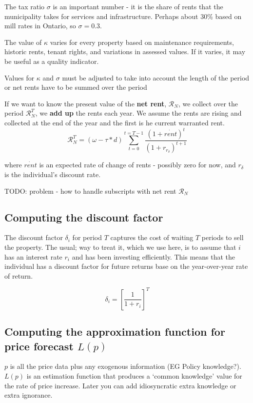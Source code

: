 The tax ratio $\sigma$ is an important number - it is the share of rents that the municipality takes for services and infrastructure. Perhaps about 30\% based on mill rates in Ontario,  so $\sigma = 0.3$. %

The value of $\kappa$  varies for every property based on maintenance requirements, historic rents, tenant rights, and variations in assessed values. If it varies, it may be useful as a quality indicator.

Values for $\kappa$ and $\sigma$ must be adjusted to take into account the length of the period or net rents have to be summed over the period

If we want to know the  present value  of the \textbf{net rent}, $\mathcal{R}_N$, we collect over the period  $\mathcal{R}_N^T$, we \textbf{add up} the rents each year. We assume the rents are rising and collected at the end of the year and the first is he current warranted rent.
\[\mathcal{R}_N^T= (\omega-\tau*d)\sum_{t=0}^{t=T-1} \frac{(1+\dot{rent})^{t}} {(1+r_{r_\delta})^{t+1}} \]

\noindent where $\dot{rent}$ is an expected rate of change of rents - possibly zero for now, and $r_\delta$ is the individual's discount rate.

TODO: problem - how to handle subscripts with net rent $\mathcal{R}_N$


\subsection{Computing the discount factor}

The discount factor $\delta_i$ for period $T$ captures the cost of waiting $T$ periods to sell the property. The usual; way to treat it, which we use here, is to assume that $i$ has an interest rate $r_i$ and has been investing efficiently. This means that  the individual has a discount factor for future returns base on the year-over-year rate of return. 

\[\delta_i=\left[\frac{1}{1+r_i}\right]^T\]


\subsection{Computing the approximation function for price forecast $L(p)$}
$p$ is all the price data plus any exogenous information (EG Policy knowledge?). $L(p)$ is an estimation function that produces a `common knowledge' value for the rate of price increase. Later you can add idiosyncratic extra knowledge or extra ignorance.


